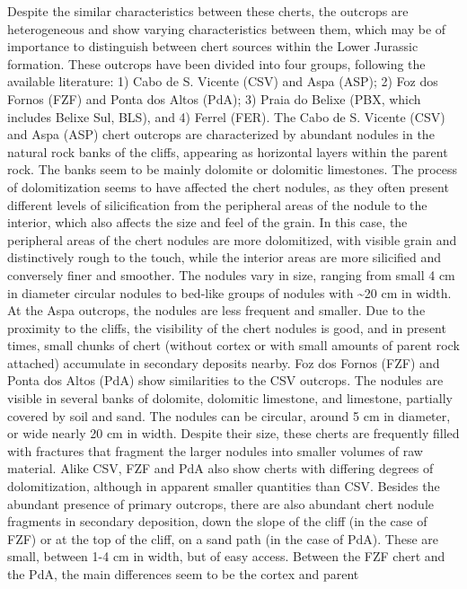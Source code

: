 \documentclass[
  a4paper,
  DIV=11,
  numbers=noendperiod]{scrreprt}
\begin{document}
Despite the similar characteristics between these cherts, the outcrops
are heterogeneous and show varying characteristics between them, which
may be of importance to distinguish between chert sources within the
Lower Jurassic formation. These outcrops have been divided into four
groups, following the available literature: 1) Cabo de S. Vicente (CSV)
and Aspa (ASP); 2) Foz dos Fornos (FZF) and Ponta dos Altos (PdA); 3)
Praia do Belixe (PBX, which includes Belixe Sul, BLS), and 4) Ferrel
(FER). The Cabo de S. Vicente (CSV) and Aspa (ASP) chert outcrops are
characterized by abundant nodules in the natural rock banks of the
cliffs, appearing as horizontal layers within the parent rock. The banks
seem to be mainly dolomite or dolomitic limestones. The process of
dolomitization seems to have affected the chert nodules, as they often
present different levels of silicification from the peripheral areas of
the nodule to the interior, which also affects the size and feel of the
grain. In this case, the peripheral areas of the chert nodules are more
dolomitized, with visible grain and distinctively rough to the touch,
while the interior areas are more silicified and conversely finer and
smoother. The nodules vary in size, ranging from small 4 cm in diameter
circular nodules to bed-like groups of nodules with \textasciitilde20 cm
in width. At the Aspa outcrops, the nodules are less frequent and
smaller. Due to the proximity to the cliffs, the visibility of the chert
nodules is good, and in present times, small chunks of chert (without
cortex or with small amounts of parent rock attached) accumulate in
secondary deposits nearby. Foz dos Fornos (FZF) and Ponta dos Altos
(PdA) show similarities to the CSV outcrops. The nodules are visible in
several banks of dolomite, dolomitic limestone, and limestone, partially
covered by soil and sand. The nodules can be circular, around 5 cm in
diameter, or wide nearly 20 cm in width. Despite their size, these
cherts are frequently filled with fractures that fragment the larger
nodules into smaller volumes of raw material. Alike CSV, FZF and PdA
also show cherts with differing degrees of dolomitization, although in
apparent smaller quantities than CSV. Besides the abundant presence of
primary outcrops, there are also abundant chert nodule fragments in
secondary deposition, down the slope of the cliff (in the case of FZF)
or at the top of the cliff, on a sand path (in the case of PdA). These
are small, between 1-4 cm in width, but of easy access. Between the FZF
chert and the PdA, the main differences seem to be the cortex and parent
\end{document}
